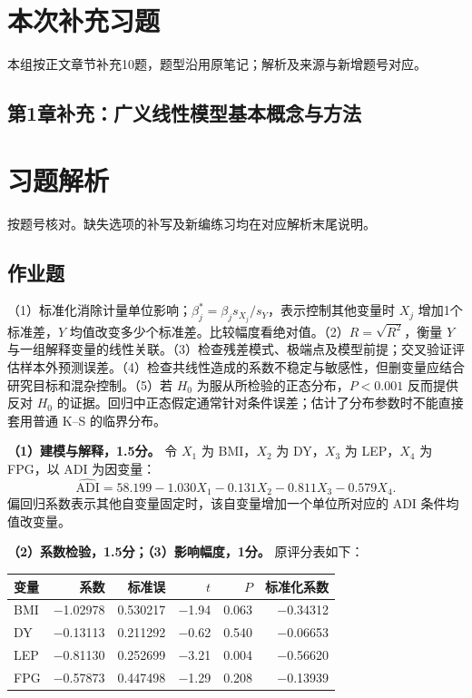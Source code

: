 \clearpage\section{本次补充习题}
本组按正文章节补充10题，题型沿用原笔记；解析及来源与新增题号对应。
\subsection*{第1章补充：广义线性模型基本概念与方法}


\clearpage\section{习题解析}

\begin{keyidea}[核对方式]按题号核对。缺失选项的补写及新编练习均在对应解析末尾说明。\end{keyidea}

\subsection{作业题}


（1）标准化消除计量单位影响；\(\beta_j^*=\beta_j s_{X_j}/s_Y\)，表示控制其他变量时 \(X_j\) 增加1个标准差，\(Y\) 均值改变多少个标准差。比较幅度看绝对值。（2）\(R=\sqrt{R^2}\)，衡量 \(Y\) 与一组解释变量的线性关联。（3）检查残差模式、极端点及模型前提；交叉验证评估样本外预测误差。（4）检查共线性造成的系数不稳定与敏感性，但删变量应结合研究目标和混杂控制。（5）若 \(H_0\) 为服从所检验的正态分布，\(P<0.001\) 反而提供反对 \(H_0\) 的证据。回归中正态假定通常针对条件误差；估计了分布参数时不能直接套用普通 K--S 的临界分布。



\textbf{（1）建模与解释，1.5分。} 令 \(X_1\) 为 BMI，\(X_2\) 为 DY，\(X_3\) 为 LEP，\(X_4\) 为 FPG，以 ADI 为因变量： \[\widehat{\mathrm{ADI}}=58.199-1.030X_1-0.131X_2-0.811X_3-0.579X_4.\] 偏回归系数表示其他自变量固定时，该自变量增加一个单位所对应的 ADI 条件均值改变量。

\textbf{（2）系数检验，1.5分；（3）影响幅度，1分。} 原评分表如下：

\begin{longtable}[]{@{}lrrrrr@{}}
\toprule\noalign{}
变量 & 系数 & 标准误 & \(t\) & \(P\) & 标准化系数 \\
\midrule\noalign{}
\endhead
\bottomrule\noalign{}
\endlastfoot
BMI & −1.02978 & 0.530217 & −1.94 & 0.063 & −0.34312 \\
DY & −0.13113 & 0.211292 & −0.62 & 0.540 & −0.06653 \\
LEP & −0.81130 & 0.252699 & −3.21 & 0.004 & −0.56620 \\
FPG & −0.57873 & 0.447498 & −1.29 & 0.208 & −0.13939 \\
\end{longtable}

